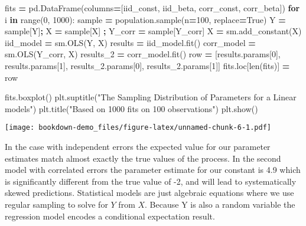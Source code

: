 \documentclass[
]{book}
\newenvironment{Shaded}{\begin{snugshade}}{\end{snugshade}}
\newcommand{\BuiltInTok}[1]{#1}
\newcommand{\ControlFlowTok}[1]{\textcolor[rgb]{0.13,0.29,0.53}{\textbf{#1}}}
\newcommand{\DecValTok}[1]{\textcolor[rgb]{0.00,0.00,0.81}{#1}}
\newcommand{\KeywordTok}[1]{\textcolor[rgb]{0.13,0.29,0.53}{\textbf{#1}}}
\newcommand{\NormalTok}[1]{#1}
\newcommand{\OperatorTok}[1]{\textcolor[rgb]{0.81,0.36,0.00}{\textbf{#1}}}
\newcommand{\StringTok}[1]{\textcolor[rgb]{0.31,0.60,0.02}{#1}}
\newcommand{\VariableTok}[1]{\textcolor[rgb]{0.00,0.00,0.00}{#1}}
\theoremstyle{definition}
\theoremstyle{definition}
\theoremstyle{definition}
\theoremstyle{remark}
\begin{document}
\begin{Shaded}
\begin{Highlighting}[]
\NormalTok{fits }\OperatorTok{=}\NormalTok{ pd.DataFrame(columns}\OperatorTok{=}\NormalTok{[}\StringTok{\textquotesingle{}iid\_const\textquotesingle{}}\NormalTok{, }\StringTok{\textquotesingle{}iid\_beta\textquotesingle{}}\NormalTok{, }\StringTok{\textquotesingle{}corr\_const\textquotesingle{}}\NormalTok{, }\StringTok{\textquotesingle{}corr\_beta\textquotesingle{}}\NormalTok{])}
\ControlFlowTok{for}\NormalTok{ i }\KeywordTok{in} \BuiltInTok{range}\NormalTok{(}\DecValTok{0}\NormalTok{, }\DecValTok{1000}\NormalTok{):}
\NormalTok{    sample }\OperatorTok{=}\NormalTok{ population.sample(n}\OperatorTok{=}\DecValTok{100}\NormalTok{, replace}\OperatorTok{=}\VariableTok{True}\NormalTok{)}
\NormalTok{    Y }\OperatorTok{=}\NormalTok{ sample[}\StringTok{\textquotesingle{}Y\textquotesingle{}}\NormalTok{]}\OperatorTok{;}\NormalTok{ X }\OperatorTok{=}\NormalTok{ sample[}\StringTok{\textquotesingle{}X\textquotesingle{}}\NormalTok{] }\OperatorTok{;}\NormalTok{ Y\_corr }\OperatorTok{=}\NormalTok{ sample[}\StringTok{\textquotesingle{}Y\_corr\textquotesingle{}}\NormalTok{]}
\NormalTok{    X }\OperatorTok{=}\NormalTok{ sm.add\_constant(X)}
\NormalTok{    iid\_model }\OperatorTok{=}\NormalTok{ sm.OLS(Y, X)}
\NormalTok{    results }\OperatorTok{=}\NormalTok{ iid\_model.fit()}
\NormalTok{    corr\_model }\OperatorTok{=}\NormalTok{ sm.OLS(Y\_corr, X)}
\NormalTok{    results\_2 }\OperatorTok{=}\NormalTok{ corr\_model.fit()}
\NormalTok{    row }\OperatorTok{=}\NormalTok{ [results.params[}\DecValTok{0}\NormalTok{], results.params[}\DecValTok{1}\NormalTok{], results\_2.params[}\DecValTok{0}\NormalTok{], results\_2.params[}\DecValTok{1}\NormalTok{]]}
\NormalTok{    fits.loc[}\BuiltInTok{len}\NormalTok{(fits)] }\OperatorTok{=}\NormalTok{ row}


\NormalTok{fits.boxplot()}
\NormalTok{plt.suptitle(}\StringTok{"The Sampling Distribution of Parameters for a Linear models"}\NormalTok{)}
\NormalTok{plt.title(}\StringTok{"Based on 1000 fits on 100 observations"}\NormalTok{)}
\NormalTok{plt.show()}
\end{Highlighting}
\end{Shaded}

\texttt{[image: bookdown-demo\_files/figure-latex/unnamed-chunk-6-1.pdf]}

In the case with independent errors the expected value for our parameter estimates match almost exactly the true values of the process. In the second model with correlated errors the parameter estimate for our constant is 4.9 which is significantly different from the true value of -2, and will lead to systematically skewed predictions. Statistical models are just algebraic equations where we use regular sampling to solve for \(Y\) from \(X\). Because Y is also a random variable the regression model encodes a conditional expectation result.
\end{document}
